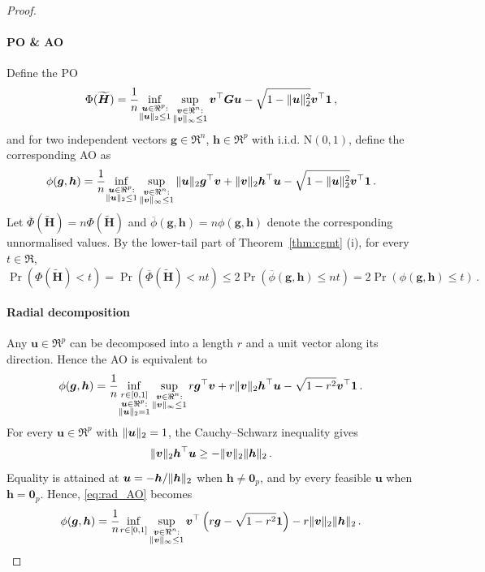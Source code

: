 \documentclass{article}
\makeatletter
\theoremstyle{definition}
\newcommand{\vnorm}[1]{%
	\ensuremath{%
		\if@display
		\left\| #1 \right\|
		\else
		\| #1 \|
		\fi
	}%
}
\newcommand*{\bb}{\boldsymbol}
\def\bH {\bb{H}}
\def\bu{\bb{u}}
\def\bv{\bb{v}}
\def\bH{\bb{H}}
\makeatother
\begin{document}
\begin{bibunit}
\begin{proof}
	\paragraph*{PO \& AO}
	Define the PO
	$$
	\Phi(\widetilde{\bH}) =  \frac{1}{n}\underset{\substack{\bu \in \Re^{p }: \\ \vnorm{\bu}_2 \leq 1}}{\inf} \, \underset{\substack{\bv \in \Re^{n}:\\ \vnorm{\bv}_\infty \leq 1}}{\sup} \, \bv^\top \bb G \bu - \sqrt{1 - \vnorm{\bu}_2^2} \bv^\top \bb 1 \,,
	$$
	and for two independent vectors $\bb g \in \Re^n$, $\bb h \in \Re^p$ with i.i.d. $\mathrm{N}(0,1)$,
	define the corresponding AO as
	$$
	\phi(\bb g, \bb h) = \frac{1}{n}\underset{\substack{\bu \in \Re^{p }: \\ \vnorm{\bu}_2 \leq 1}}{\inf} \, \underset{\substack{\bv \in \Re^{n}:\\ \vnorm{\bv}_\infty \leq 1}}{\sup} \, \vnorm{\bu}_2 \bb g^\top \bv + \vnorm{\bv}_2 \bb h^\top \bu  - \sqrt{1 - \vnorm{\bu}_2^2} \bv^\top \bb 1 \,.
	$$
	Let $\overline{\Phi}(\widetilde{\bH}) = n\Phi(\widetilde{\bH})$ and 
	$\overline{\phi}(\bb g,\bb h) = n\phi(\bb g,\bb h)$ denote the 
	corresponding unnormalised values. By the lower-tail part of 
	Theorem~\ref{thm:cgmt} (i), for every $t \in \Re$,
	$$
	\Pr\left(\Phi(\widetilde{\bH}) < t\right)
	=
	\Pr\left(\overline{\Phi}(\widetilde{\bH}) < nt\right)
	\leq
	2\Pr\left(\overline{\phi}(\bb g,\bb h) \leq nt\right)
	=
	2\Pr\left(\phi(\bb g,\bb h) \leq t\right) \,.
	$$
	\paragraph*{Radial decomposition}
	Any $\bu \in \Re^{p}$ can be decomposed into a length $r$ and a unit vector along its direction. Hence the AO is equivalent to
	\begin{equation}
	\label{eq:rad_AO}
	\phi(\bb g, \bb h) =	\frac{1}{n}\underset{\substack{r \in [0,1] \\ \bu \in \Re^{p}: \\ \vnorm{\bu}_2 = 1}}{\inf}\,  \underset{\substack{\bv \in \Re^{n}:\\ \vnorm{\bv}_\infty \leq 1}}{\sup} \, r \bb g^\top \bv + r \vnorm{\bb v}_2 \bb h^\top \bu  - \sqrt{1 - r^2} \bv^\top \bb 1 \,.
	\end{equation}
	For every $\bu\in\Re^p$ with $\vnorm{\bu}_2=1$, the
	Cauchy--Schwarz inequality gives
	$$
	\vnorm{\bv}_2\bb h^\top\bu
	\geq
	-\vnorm{\bv}_2\vnorm{\bb h}_2 \,.
	$$
	Equality is attained at $\bu=-\bb h/\vnorm{\bb h}_2$ when
	$\bb h\neq\bb0_p$, and by every feasible $\bu$ when
	$\bb h=\bb0_p$. Hence, \eqref{eq:rad_AO} becomes
	\begin{equation}
	\label{eq:rad_AO1}
	\phi(\bb g, \bb h) = \frac{1}{n}\underset{r \in [0,1]}{\inf} \, \underset{\substack{\bv \in \Re^{n}:\\ \vnorm{\bv}_\infty \leq 1}}{\sup} \,  \bv^\top \left(r \bb g - \sqrt{1 - r^2} \bb 1 \right) - r \vnorm{\bv}_2 \vnorm{\bb h}_2  \,.
	\end{equation}

\end{proof}
\end{bibunit}
\end{document}
